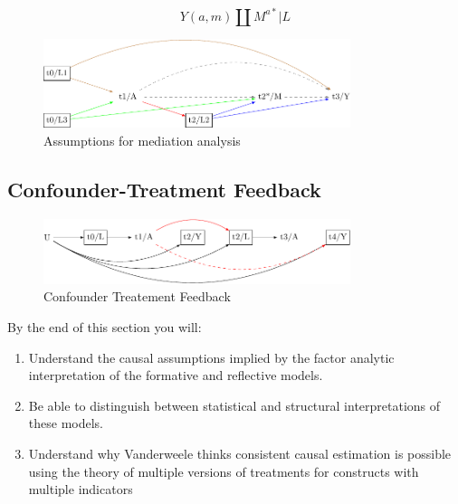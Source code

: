 \documentclass[
  singlecolumn]{report}
\begin{document}
\[Y(a,m)\coprod M^{a*}|L\]

\begin{figure}

{\centering \includegraphics[width=0.8\textwidth,height=\textheight]{causal-dags_files/figure-pdf/fig-dag-mediation-assuptions-1.pdf}

}

\caption{\label{fig-dag-mediation-assuptions}Assumptions for mediation
analysis}

\end{figure}

\hypertarget{confounder-treatment-feedback}{%
\subsection{Confounder-Treatment
Feedback}\label{confounder-treatment-feedback}}

\begin{figure}

{\centering \includegraphics[width=0.8\textwidth,height=\textheight]{causal-dags_files/figure-pdf/fig-dag-9-1.pdf}

}

\caption{\label{fig-dag-9}Confounder Treatement Feedback}

\end{figure}

By the end of this section you will:

\begin{enumerate}
\def\labelenumi{\arabic{enumi}.}
\item
  Understand the causal assumptions implied by the factor analytic
  interpretation of the formative and reflective models.
\item
  Be able to distinguish between statistical and structural
  interpretations of these models.
\item
  Understand why Vanderweele thinks consistent causal estimation is
  possible using the theory of multiple versions of treatments for
  constructs with multiple indicators
\end{enumerate}
\end{document}
